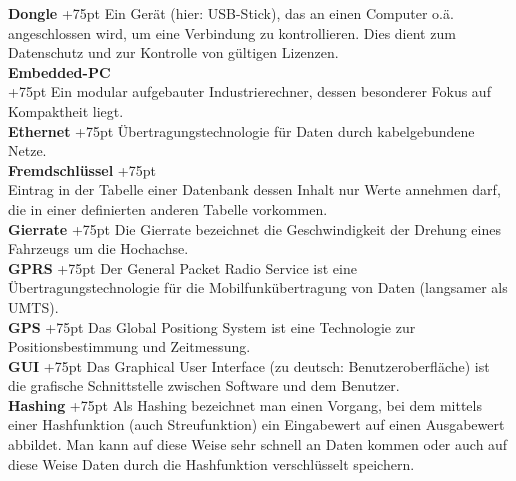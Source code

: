 \documentclass[fontsize = 12pt, paper = a4]{scrreprt}
\begin{document}
\textbf{Dongle}
\hangindent+75pt 
\hspace*{8.75mm}
Ein Gerät (hier: USB-Stick), das an einen Computer o.ä. angeschlossen wird, um eine Verbindung zu kontrollieren. Dies dient zum Datenschutz und zur Kontrolle von gültigen Lizenzen.\\

\textbf{Embedded-PC} \\
\hangindent+75pt  
Ein modular aufgebauter Industrierechner, dessen besonderer Fokus auf Kompaktheit liegt.\\

\textbf{Ethernet}
\hangindent+75pt 
\hspace*{5.5mm}
Übertragungstechnologie für Daten durch kabelgebundene Netze.\\

\textbf{Fremdschlüssel}
\hangindent+75pt 
\\
Eintrag in der Tabelle einer Datenbank dessen Inhalt nur Werte annehmen darf, die in einer definierten anderen Tabelle vorkommen.\\

\textbf{Gierrate}
\hangindent+75pt 
\hspace*{6.5mm}
Die Gierrate bezeichnet die Geschwindigkeit der Drehung eines Fahrzeugs um die Hochachse.\\

\textbf{GPRS}
\hangindent+75pt 
\hspace*{10.5mm}
Der General Packet Radio Service ist eine Übertragungstechnologie für die Mobilfunkübertragung von Daten (langsamer als UMTS).\\

\textbf{GPS}
\hangindent+75pt 
\hspace*{14mm}
Das Global Positiong System ist eine Technologie zur Positionsbestimmung und Zeitmessung.\\

\textbf{GUI}
\hangindent+75pt 
\hspace*{14.5mm}
Das Graphical User Interface (zu deutsch: Benutzeroberfläche) ist die grafische Schnittstelle zwischen Software und dem Benutzer.\\

\textbf{Hashing}
\hangindent+75pt   
\hspace*{6.5mm}
Als Hashing bezeichnet man einen Vorgang, bei dem mittels einer Hashfunktion (auch Streufunktion) ein Eingabewert auf einen Ausgabewert abbildet. Man kann auf diese Weise sehr schnell an Daten kommen oder auch auf diese Weise Daten durch die Hashfunktion verschlüsselt speichern.\\
\end{document}
